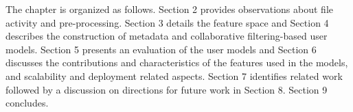 {%

The chapter is organized as follows. 
  Section 2 provides observations about file activity and pre-processing.
  Section 3 details the feature space and
  Section 4 describes the construction of metadata and collaborative filtering-based user models.
  Section 5 presents an evaluation of the user models and 
  Section 6 discusses the contributions and characteristics of the features used
  in the models, and scalability and deployment related aspects. 
  Section 7 identifies related work followed by a discussion on directions for future work in Section 8. Section 9 concludes. 
}
